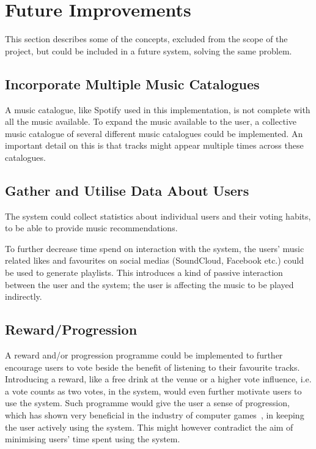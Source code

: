 \section{Future Improvements}
\label{future}

This section describes some of the concepts, excluded from the scope of the project, but could be included in a future system, solving the same problem.

\subsection{Incorporate Multiple Music Catalogues}
A music catalogue, like Spotify used in this implementation, is not complete with all the music available. To expand the music available to the user, a collective music catalogue of several different music catalogues could be implemented. An important detail on this is that tracks might appear multiple times across these catalogues.

\subsection{Gather and Utilise Data About Users}
The system could collect statistics about individual users and their voting habits, to be able to provide music recommendations.

To further decrease time spend on interaction with the system, the users' music related likes and favourites on social medias (SoundCloud, Facebook etc.) could be used to generate playlists. This introduces a kind of passive interaction between the user and the system; the user is affecting the music to be played indirectly.

\subsection{Reward/Progression}
A reward and/or progression programme could be implemented to further encourage users to vote beside the benefit of listening to their favourite tracks. Introducing a reward, like a free drink at the venue or a higher vote influence, i.e. a vote counts as two votes, in the system, would even further motivate users to use the system. Such programme would give the user a sense of progression, which has shown very beneficial in the industry of computer games~\cite{games}, in keeping the user actively using the system. This might however contradict the aim of minimising users' time spent using the system.
